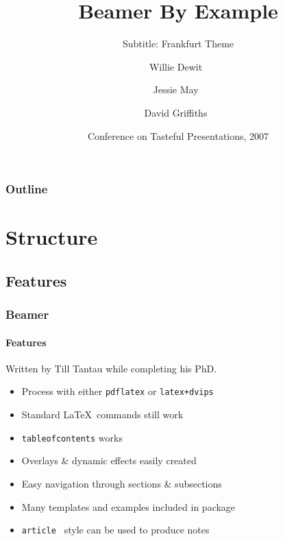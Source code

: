 \documentclass{article}
\title[Beamer By Example] %
{Beamer By Example}
\subtitle
{Subtitle: Frankfurt Theme}
\author[dfg] %
{Willie Dewit~\inst{1} \and Jessie May~\inst{2} \and David Griffiths~\inst{3}}
\institute[Universities of Somewhere and Elsewhere] %
{
  \inst{1}%
  Department of Mathematics\\
  University of Somewhere
  \and
  \inst{2}%
  Scottish Institute for Higher \TeX nology
  \and
  \inst{3}%
  University of Dundee}
\date[CTP 2007] %
{Conference on Tasteful Presentations, 2007}
\begin{document}
\maketitle
\begin{frame}
  \titlepage
\end{frame}

\begin{frame}
  \frametitle{Outline}
  \tableofcontents[pausesections]
\end{frame}




\section{Structure}
\subsection{Features}
\begin{frame}
\frametitle{Beamer}
\framesubtitle{Features}
Written by Till Tantau while completing his PhD.
\begin{itemize}
\item Process with either \texttt{pdflatex} or \texttt{latex+dvips}\pause
\item Standard \LaTeX\ commands still work\pause
\item \texttt{tableofcontents} works \pause
\item Overlays \&  dynamic effects easily created\pause
\item Easy navigation through sections \&  subsections\pause
\item Many templates and examples included in package\pause
\item \texttt{article } style can be used to produce notes
\end{itemize}
\end{frame}
\end{document}
